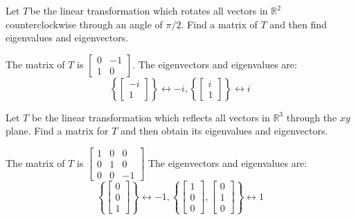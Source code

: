 \documentclass{ximera}
\begin{document}
\begin{problem}\label{prb:8.18} Let $T\,$be the linear transformation which rotates all vectors in
$\mathbb{R}^{2}$ counterclockwise through an angle of $\pi /2.$ Find a matrix
of $T$ and then find eigenvalues and eigenvectors.
\begin{hint}
The matrix of $T$ is $\left[
\begin{array}{rr}
0 & -1 \\
1 & 0
\end{array}
\right]$. The eigenvectors and eigenvalues are:
\[
\left\{ \left[
\begin{array}{r}
-i \\
1
\end{array}
\right] \right\} \leftrightarrow -i,\left\{ \left[
\begin{array}{c}
i \\
1
\end{array}
\right] \right\} \leftrightarrow i
\]
\end{hint}
\end{problem}

\begin{problem}\label{prb:8.19} Let $T$ be the linear transformation which reflects all vectors in $
\mathbb{R}^{3}$ through the $xy$ plane. Find a matrix for $T$ and then
obtain its eigenvalues and eigenvectors.
\begin{hint}
The matrix of $T$ is $\left[
\begin{array}{rrr}
1 & 0 & 0 \\
0 & 1 & 0 \\
0 & 0 & -1
\end{array}
\right]$
The eigenvectors and eigenvalues are:
\[
\left\{ \left[
\begin{array}{c}
0 \\
0 \\
1
\end{array}
\right] \right\} \leftrightarrow -1,\left\{ \left[
\begin{array}{c}
1 \\
0 \\
0
\end{array}
\right] ,\left[
\begin{array}{c}
0 \\
1 \\
0
\end{array}
\right] \right\} \leftrightarrow 1
\]
\end{hint}
\end{problem}
\end{document}
